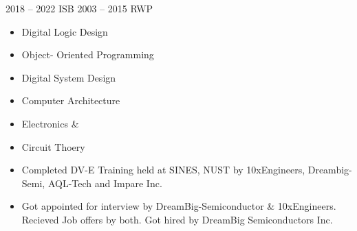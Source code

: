        { 2018 -- 2022 }{ISB}
           { 2003 -- 2015 }{RWP}

\smallskip
\divider
{} 
\divider
{}
\divider
{}

\smallskip
\smallskip

\begin{itemize}
    \item Digital Logic Design
    \item Object- Oriented Programming
    \item Digital System Design
    \item Computer Architecture
    \item Electronics  \& 
    \item Circuit Thoery
    \smallskip
\end{itemize}

\divider
{}

\smallskip
\begin{itemize}
\item Completed DV-E Training held at SINES, NUST by 10xEngineers, Dreambig-Semi, AQL-Tech and Impare Inc.
\item Got appointed for interview by DreamBig-Semiconductor \& 10xEngineers. Recieved Job offers by both. Got hired by DreamBig Semiconductors Inc.
\end{itemize}
